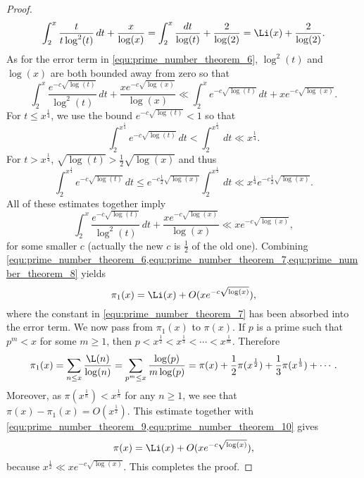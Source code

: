 \begin{proof}
        \begin{equation}\label{equ:prime_number_theorem_7}
          \int_{2}^{x}\frac{t}{t\log^{2}(t)}\,dt+\frac{x}{\log(x)} = \int_{2}^{x}\frac{dt}{\log(t)}+\frac{2}{\log(2)} = \Li(x)+\frac{2}{\log(2)}.
        \end{equation}
        As for the error term in \cref{equ:prime_number_theorem_6}, $\log^{2}(t)$ and $\log(x)$ are both bounded away from zero so that
        \[
          \int_{2}^{x}\frac{e^{-c\sqrt{\log(t)}}}{\log^{2}(t)}\,dt+\frac{xe^{-c\sqrt{\log(x)}}}{\log(x)} \ll \int_{2}^{x}e^{-c\sqrt{\log(t)}}\,dt+xe^{-c\sqrt{\log(x)}}.
        \]
        For $t \le x^{\frac{1}{4}}$, we use the bound $e^{-c\sqrt{\log(t)}} < 1$ so that
        \[
          \int_{2}^{x^{\frac{1}{4}}}e^{-c\sqrt{\log(t)}}\,dt < \int_{2}^{x^{\frac{1}{4}}}\,dt \ll x^{\frac{1}{4}}.
        \]
        For $t > x^{\frac{1}{4}}$, $\sqrt{\log(t)} > \frac{1}{2}\sqrt{\log(x)}$ and thus
        \[
          \int_{2}^{x^{\frac{1}{4}}}e^{-c\sqrt{\log(t)}}\,dt \le e^{-c\frac{1}{2}\sqrt{\log(x)}}\int_{2}^{x^{\frac{1}{4}}}\,dt \ll x^{\frac{1}{4}}e^{-c\frac{1}{2}\sqrt{\log(x)}}. 
        \]
        All of these estimates together imply
        \begin{equation}\label{equ:prime_number_theorem_8}
          \int_{2}^{x}\frac{e^{-c\sqrt{\log(t)}}}{\log^{2}(t)}\,dt+\frac{xe^{-c\sqrt{\log(x)}}}{\log(x)} \ll xe^{-c\sqrt{\log(x)}},
        \end{equation}
        for some smaller $c$ (actually the new $c$ is $\frac{1}{2}$ of the old one). Combining \cref{equ:prime_number_theorem_6,equ:prime_number_theorem_7,equ:prime_number_theorem_8} yields
        \begin{equation}\label{equ:prime_number_theorem_9}
          \pi_{1}(x) = \Li(x)+O(xe^{-c\sqrt{\log(x)}}),
        \end{equation}
        where the constant in \cref{equ:prime_number_theorem_7} has been absorbed into the error term. We now pass from $\pi_{1}(x)$ to $\pi(x)$. If $p$ is a prime such that $p^{m} < x$ for some $m \ge 1$, then $p < x^{\frac{1}{2}} < x^{\frac{1}{3}} < \cdots < x^{\frac{1}{m}}$. Therefore
        \begin{equation}\label{equ:prime_number_theorem_10}
          \pi_{1}(x) = \sum_{n \le x}\frac{\L(n)}{\log(n)} = \sum_{p^{m} \le x}\frac{\log(p)}{m\log(p)} = \pi(x)+\frac{1}{2}\pi(x^{\frac{1}{2}})+\frac{1}{3}\pi(x^{\frac{1}{3}})+\cdots.
        \end{equation}
        Moreover, as $\pi(x^{\frac{1}{n}}) < x^{\frac{1}{n}}$ for any $n \ge 1$, we see that $\pi(x)-\pi_{1}(x) = O(x^{\frac{1}{2}})$. This estimate together with \cref{equ:prime_number_theorem_9,equ:prime_number_theorem_10} gives
        \[
          \pi(x) = \Li(x)+O(xe^{-c\sqrt{\log(x)}}),
        \]
        because $x^{\frac{1}{2}} \ll xe^{-c\sqrt{\log(x)}}$. This completes the proof.
      \end{proof}

